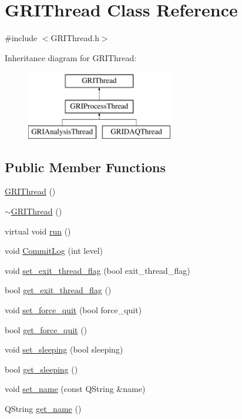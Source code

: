 \hypertarget{classGRIThread}{\section{\-G\-R\-I\-Thread \-Class \-Reference}
\label{classGRIThread}
}


{\ttfamily \#include $<$\-G\-R\-I\-Thread.\-h$>$}

\-Inheritance diagram for \-G\-R\-I\-Thread\-:\begin{figure}[H]
\begin{center}
\leavevmode
\includegraphics[height=3.000000cm]{classGRIThread}
\end{center}
\end{figure}
\subsection*{\-Public \-Member \-Functions}
\begin{DoxyCompactItemize}
\item 
\hyperlink{classGRIThread_a4aaa2f1c4e2619ca4ccc3f36cd94165a}{\-G\-R\-I\-Thread} ()
\item 
\hyperlink{classGRIThread_a94c170f5a1e8ec54d6d715ae7e84620a}{$\sim$\-G\-R\-I\-Thread} ()
\item 
virtual void \hyperlink{classGRIThread_ae1b28195c7dcc1a241401af506597c67}{run} ()
\item 
void \hyperlink{classGRIThread_aec77bf5b50eb3eb7b2388cb83d3bf40f}{\-Commit\-Log} (int level)
\item 
void \hyperlink{classGRIThread_abb6e0c600ff6bb3cac028897ba7328d5}{set\-\_\-exit\-\_\-thread\-\_\-flag} (bool exit\-\_\-thread\-\_\-flag)
\item 
bool \hyperlink{classGRIThread_ae9efcc46bc524a3decbb514d79357c94}{get\-\_\-exit\-\_\-thread\-\_\-flag} ()
\item 
void \hyperlink{classGRIThread_a2ebe0605edc6a46f7c1825859035afc3}{set\-\_\-force\-\_\-quit} (bool force\-\_\-quit)
\item 
bool \hyperlink{classGRIThread_a4109f737fd9c24038dd0eedfc1c6a058}{get\-\_\-force\-\_\-quit} ()
\item 
void \hyperlink{classGRIThread_a3c898be7b730281944ad8ac16ea8cba7}{set\-\_\-sleeping} (bool sleeping)
\item 
bool \hyperlink{classGRIThread_a331eabba7b6559df1ed74e6605351427}{get\-\_\-sleeping} ()
\item 
void \hyperlink{classGRIThread_aa8f133c793457423eb98b2df5da1ed59}{set\-\_\-name} (const \-Q\-String \&name)
\item 
\-Q\-String \hyperlink{classGRIThread_a33f10e6e463f79e06f40e3a55f36281e}{get\-\_\-name} ()
\end{DoxyCompactItemize}
